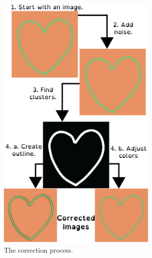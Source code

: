 \documentclass[12pt]{article}
\begin{document}
\pagebreak
\begin{figure}[H]
	\centering
	\includegraphics[width=0.7\textwidth]{img/process.png}
	\caption{The correction process.}
	\label{fig:process}
\end{figure}
\end{document}
